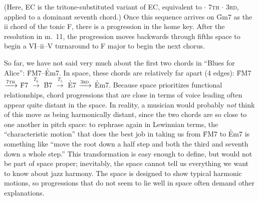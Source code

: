 \noindent (Here, EC is the tritone-substituted variant of EC,
equivalent to \tft $\cdot$ \textsc{7th} $\cdot$ \textsc{3rd}, applied to a
dominant seventh chord.) Once this sequence arrives on \h{Gm7} as the ii chord
of the tonic F, there is a \tfo progression in the home key. After the
resolution in m.~11, the progression moves backwards through fifths space to
begin a VI--ii--V turnaround to F major to begin the next chorus.

So far, we have not said very much about the first two chords in ``Blues for
Alice'': \h{FM7}--\h{Em7}. In \tf space, these chords are relatively far
apart (4 edges): \h{FM7} $\xrightarrow{\text{\textsc{7th}}}$ \h{F7} $\xrightarrow{T_6}$
\h{B7} $\xrightarrow{T_5}$ \h{E7} $\xrightarrow{\text{\textsc{3rd}}}$ \h{Em7}.
Because \tf space prioritizes functional relationships, chord progressions
that are close in terms of voice leading often appear quite distant in the
space. In reality, a musician would probably \emph{not} think of this move as
being harmonically distant, since the two chords are so close to one another
in pitch space: to rephrase again in Lewinnian terms, the ``characteristic
motion'' that does the best job in taking us from \h{FM7} to \h{Em7} is
something like ``move the root down a half step and both the third and seventh
down a whole step.'' This transformation is easy enough to define, but would
not be part of \tf space proper; inevitably, the space cannot tell us
everything we want to know about jazz harmony. The space is designed to show
typical harmonic motions, so progressions that do not seem to lie well in \tf
space often demand other explanations.







